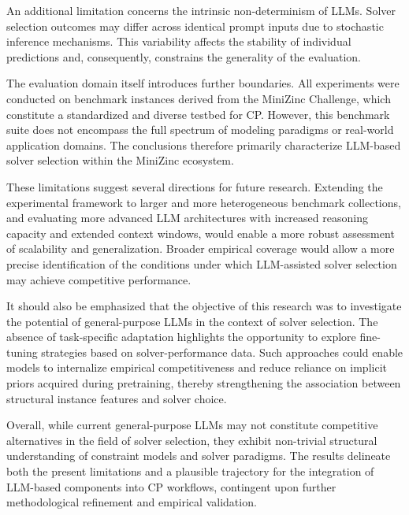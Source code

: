 \documentclass[../../main]{subfiles}
\begin{document}
An additional limitation concerns the intrinsic non-determinism of LLMs. Solver selection outcomes may differ across identical prompt inputs due to stochastic inference mechanisms. This variability affects the stability of individual predictions and, consequently, constrains the generality of the evaluation.

The evaluation domain itself introduces further boundaries. All experiments were conducted on benchmark instances derived from the MiniZinc Challenge, which constitute a standardized and diverse testbed for CP. However, this benchmark suite does not encompass the full spectrum of modeling paradigms or real-world application domains. The conclusions therefore primarily characterize LLM-based solver selection within the MiniZinc ecosystem.

These limitations suggest several directions for future research. Extending the experimental framework to larger and more heterogeneous benchmark collections, and evaluating more advanced LLM architectures with increased reasoning capacity and extended context windows, would enable a more robust assessment of scalability and generalization. Broader empirical coverage would allow a more precise identification of the conditions under which LLM-assisted solver selection may achieve competitive performance.

It should also be emphasized that the objective of this research was to investigate the potential of general-purpose LLMs in the context of solver selection. The absence of task-specific adaptation highlights the opportunity to explore fine-tuning strategies based on solver-performance data. Such approaches could enable models to internalize empirical competitiveness and reduce reliance on implicit priors acquired during pretraining, thereby strengthening the association between structural instance features and solver choice.

Overall, while current general-purpose LLMs may not constitute competitive alternatives in the field of solver selection, they exhibit non-trivial structural understanding of constraint models and solver paradigms. The results delineate both the present limitations and a plausible trajectory for the integration of LLM-based components into CP workflows, contingent upon further methodological refinement and empirical validation.
\end{document}
